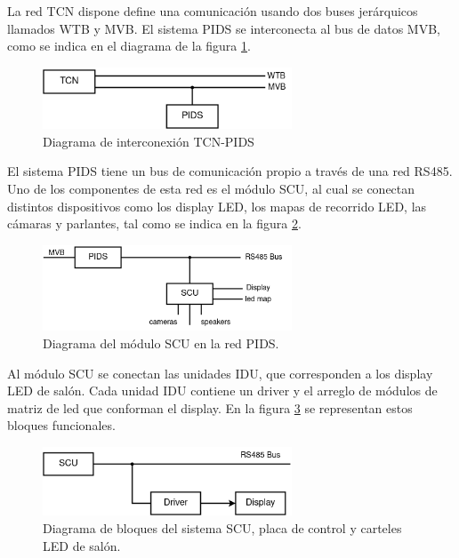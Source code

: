 La red TCN dispone define una comunicación usando dos buses jerárquicos llamados WTB y MVB. El sistema PIDS se interconecta al bus de datos MVB, como se indica en el diagrama de la figura \ref{fig:diagTcnPidsBuusesWtbMvb}.\\


\begin{figure}[ht]
	\centering
	\includegraphics[width=0.66\textwidth]{./Figures/diagTcnPidsBusesWtbMvb.png}
	\caption{Diagrama de interconexión TCN-PIDS}
	\label{fig:diagTcnPidsBuusesWtbMvb}
\end{figure}

El sistema PIDS tiene un bus de comunicación propio a través de una red RS485. Uno de los componentes de esta red es el módulo SCU, al cual se conectan distintos dispositivos como los display LED, los mapas de recorrido LED, las cámaras y parlantes, tal como se indica en la figura 	\ref{fig:diagPidsScuDevices}.\\


\begin{figure}[ht]
	\centering
	\includegraphics[width=0.66\textwidth]{./Figures/diagPidsScuDevices.png}
	\caption{Diagrama del módulo SCU en la red PIDS.}
	\label{fig:diagPidsScuDevices}
\end{figure}

Al módulo SCU se conectan las unidades IDU, que corresponden a los display LED de salón. Cada unidad IDU contiene un driver y el arreglo de módulos de matriz de led que conforman el display. En la figura \ref{fig:diagScuDriverDisplay} se representan estos bloques funcionales.\\


\begin{figure}[ht]
	\centering
	\includegraphics[width=0.66\textwidth]{./Figures/diagScuDriverDisplay.png}
	\caption{Diagrama de bloques del sistema SCU, placa de control y carteles LED de salón.}
	\label{fig:diagScuDriverDisplay}
\end{figure}

